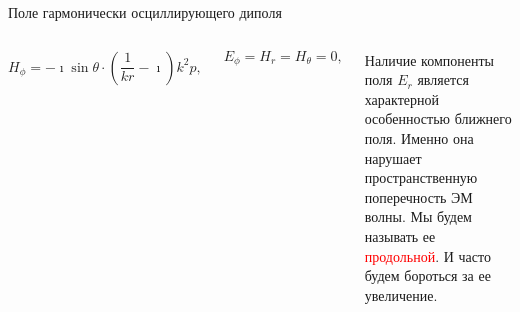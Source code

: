 \documentclass[9pt, compress, xcolor=table]{beamer}
\begin{document}
\begin{frame}{Поле гармонически осциллирующего диполя}
\begin{columns}[c]
\begin{equation*}
H_{\phi} = -\imath \sin\theta \cdot \left( \frac{1}{kr} - \imath \right) k^2 p, 
\end{equation*}

\begin{equation*}
E_{\phi} = H_r = H_{\theta} = 0,
\end{equation*}

Наличие компоненты поля $E_r$ является  характерной особенностью ближнего поля. Именно она нарушает пространственную поперечность ЭМ волны. Мы будем называть ее \textcolor{red}{продольной}. И часто будем бороться за ее увеличение.

\end{columns}

\end{frame}
\end{document}
